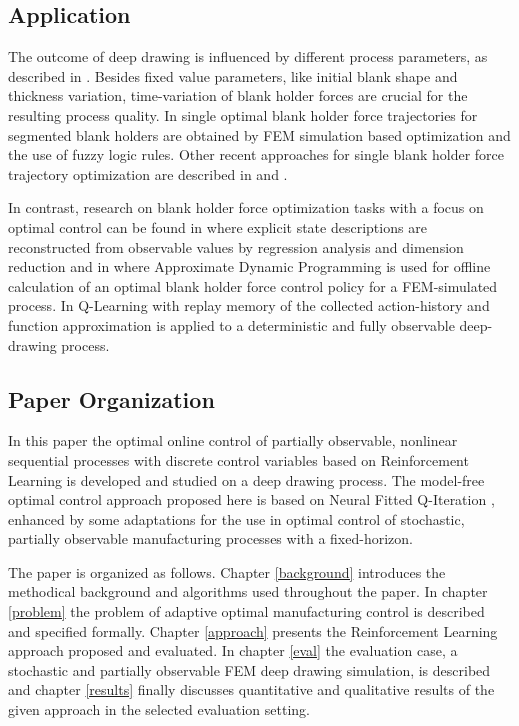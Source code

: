 \subsection{Application}
\label{introApplication}
The outcome of deep drawing is influenced by different process parameters, as described in \cite{Singh2015}. Besides fixed value parameters, like initial blank shape and thickness variation, time-variation of blank holder forces are crucial for the resulting process quality. In \cite{Volk2011} single optimal blank holder force trajectories for segmented blank holders are obtained by FEM simulation based optimization and the use of fuzzy logic rules. Other recent approaches for single blank holder force trajectory optimization are described in \cite{Tommerup2012} and \cite{Wifi2007}. 

In contrast, research on blank holder force optimization tasks with a focus on optimal control can be found in \cite{Senn2013} where explicit state descriptions are reconstructed from observable values by regression analysis and dimension reduction and in \cite{Senn2014} where Approximate Dynamic Programming is used for offline calculation of an optimal blank holder force control policy for a FEM-simulated process. In \cite{Dornheim2017} Q-Learning with replay memory of the collected action-history and function approximation is applied to a deterministic and fully observable deep-drawing process.

\subsection{Paper Organization}
\label{introOrganization}
In this paper the optimal online control of partially observable, nonlinear sequential processes with discrete control variables based on Reinforcement Learning is developed and studied on a deep drawing process. The model-free optimal control approach proposed here is based on Neural Fitted Q-Iteration \cite{Riedmiller2005}, enhanced by some adaptations for the use in optimal control of stochastic, partially observable manufacturing processes with a fixed-horizon. 

The paper is organized as follows. Chapter \ref{background} introduces the methodical background and algorithms used throughout the paper. In chapter \ref{problem} the problem of adaptive optimal manufacturing control is described and specified formally. Chapter \ref{approach} presents the Reinforcement Learning approach proposed and evaluated. In chapter \ref{eval} the evaluation case, a stochastic and partially observable FEM deep drawing simulation, is described and chapter \ref{results} finally discusses quantitative and qualitative results of the given approach in the selected evaluation setting.


